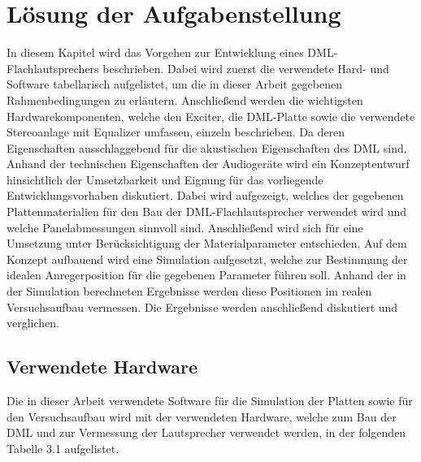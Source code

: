 \chapter{Lösung der Aufgabenstellung}

In diesem Kapitel wird das Vorgehen zur Entwicklung eines DML-Flachlautsprechers beschrieben. Dabei wird zuerst die verwendete Hard- und Software tabellarisch aufgelistet, um die in dieser Arbeit gegebenen Rahmenbedingungen zu erläutern. Anschließend werden die wichtigsten Hardwarekomponenten, welche den Exciter, die DML-Platte sowie die verwendete Stereoanlage mit Equalizer umfassen, einzeln beschrieben. Da deren Eigenschaften ausschlaggebend für die akustischen Eigenschaften des DML sind. Anhand der technischen Eigenschaften der Audiogeräte wird ein Konzeptentwurf hinsichtlich der Umsetzbarkeit und Eignung für das vorliegende Entwicklungsvorhaben diskutiert. Dabei wird aufgezeigt, welches der gegebenen Plattenmaterialien für den Bau der DML-Flachlautsprecher verwendet wird und welche Panelabmessungen sinnvoll sind. Anschließend wird sich für eine Umsetzung unter Berücksichtigung der Materialparameter entschieden.
Auf dem Konzept aufbauend wird eine Simulation aufgesetzt, welche zur Bestimmung der idealen Anregerposition für die gegebenen Parameter führen soll. Anhand der in der Simulation berechneten Ergebnisse werden diese Positionen im realen Versuchsaufbau vermessen. Die Ergebnisse werden anschließend diskutiert und verglichen.


\section{Verwendete Hardware}

Die in dieser Arbeit verwendete Software für die Simulation der Platten sowie für den Versuchsaufbau wird mit der verwendeten Hardware, welche zum Bau der DML und zur Vermessung der Lautsprecher verwendet werden, in der folgenden Tabelle 3.1 aufgelistet.

